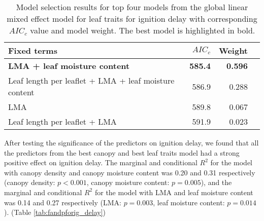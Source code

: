 \documentclass{bmcart}
\begin{document}
\begin{table}
  \centering
  \caption{Model selection results for top four models from the global linear
    mixed effect model for leaf traits for ignition delay with corresponding
    $AIC_{c}$ value and model weight. The best model is highlighted in bold.}
  \begin{tabular}{lrrr}
    \toprule
    \textbf{Fixed terms} & $AIC_{c}$ & \textbf{Weight}\\
    \midrule
    \textbf{LMA + leaf moisture content}    & \textbf{585.4} & \textbf{0.596} \\
    Leaf length per leaflet + LMA + leaf moisture content & 586.9          & 0.288          \\
    LMA                                                   & 589.8          & 0.067          \\
    Leaf length per leaflet + LMA                         & 591.9          & 0.023          \\
    \bottomrule
  \end{tabular}
  \label{tab:leaf_models_ignition_delay}
\end{table}
After testing the significance of the predictors on ignition delay, we found that all the predictors from the best canopy and best leaf traits model had a strong positive effect on ignition delay. The marginal and conditional $R^2$ for the model with canopy density and canopy moisture content was 0.20 and 0.31 respectively (canopy density: $p < 0.001$, canopy moisture content: $p = 0.005$), and the marginal and conditional $R^2$ for the model with LMA and leaf moisture content was 0.14 and 0.27 respectively (LMA: $p = 0.003$, leaf moisture content: $p = 0.014$). (Table \ref{tab:fandpforig_delay})
\end{document}
